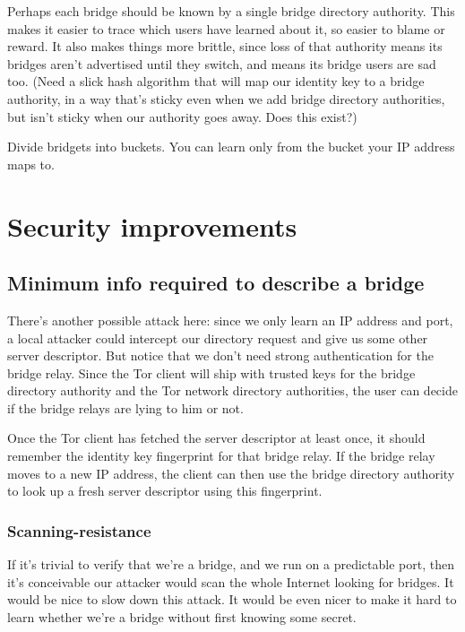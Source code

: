 \documentclass{llncs}
\begin{document}
Perhaps each bridge should be known by a single bridge directory
authority. This makes it easier to trace which users have learned about
it, so easier to blame or reward. It also makes things more brittle,
since loss of that authority means its bridges aren't advertised until
they switch, and means its bridge users are sad too.
(Need a slick hash algorithm that will map our identity key to a
bridge authority, in a way that's sticky even when we add bridge
directory authorities, but isn't sticky when our authority goes
away. Does this exist?)

Divide bridgets into buckets. You can learn only from the bucket your
IP address maps to.

\section{Security improvements}

\subsection{Minimum info required to describe a bridge}

There's another possible attack here: since we only learn an IP address
and port, a local attacker could intercept our directory request and
give us some other server descriptor. But notice that we don't need
strong authentication for the bridge relay. Since the Tor client will
ship with trusted keys for the bridge directory authority and the Tor
network directory authorities, the user can decide if the bridge relays
are lying to him or not.

Once the Tor client has fetched the server descriptor at least once,
it should remember the identity key fingerprint for that bridge relay.
If the bridge relay moves to a new IP address, the client can then
use the bridge directory authority to look up a fresh server descriptor
using this fingerprint.

\subsubsection{Scanning-resistance}

If it's trivial to verify that we're a bridge, and we run on a predictable
port, then it's conceivable our attacker would scan the whole Internet
looking for bridges. It would be nice to slow down this attack. It would
be even nicer to make it hard to learn whether we're a bridge without
first knowing some secret.
\end{document}
